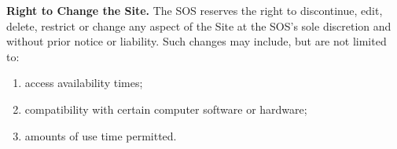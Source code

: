 \textbf{Right to Change the Site.}
The SOS reserves the right to discontinue, edit, delete, restrict or change any
aspect of the Site at the SOS's sole discretion and without prior notice or
liability. Such changes may include, but are not limited to: 
\begin{enumerate}[label=\roman*)]
    \item access availability times;
    \item compatibility with certain computer software or hardware;
    \item amounts of use time permitted.
\end{enumerate}